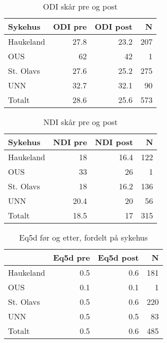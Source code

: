 \documentclass[norsk,a4paper]{article}\usepackage[]{graphicx}\usepackage[]{color}
\begin{document}
\begin{table}[ht]
\centering
\begin{tabular}{lrrr}
  \hline
Sykehus & ODI pre & ODI post & N \\ 
  \hline
Haukeland & 27.8 & 23.2 & 207 \\ 
  OUS & 62 & 42 & 1 \\ 
  St. Olavs & 27.6 & 25.2 & 275 \\ 
  UNN & 32.7 & 32.1 & 90 \\ 
  Totalt & 28.6 & 25.6 & 573 \\ 
   \hline
\end{tabular}
\caption{ODI skår pre og post} 
\end{table}
\begin{table}[ht]
\centering
\begin{tabular}{lrrr}
  \hline
Sykehus & NDI pre & NDI post & N \\ 
  \hline
Haukeland & 18 & 16.4 & 122 \\ 
  OUS & 33 & 26 & 1 \\ 
  St. Olavs & 18 & 16.2 & 136 \\ 
  UNN & 20.4 & 20 & 56 \\ 
  Totalt & 18.5 & 17 & 315 \\ 
   \hline
\end{tabular}
\caption{NDI skår pre og post} 
\end{table}


\begin{table}[ht]
\centering
\begin{tabular}{lrrr}
  \hline
 & Eq5d pre & Eq5d post & N \\ 
  \hline
Haukeland & 0.5 & 0.6 & 181 \\ 
  OUS & 0.1 & 0.1 & 1 \\ 
  St. Olavs & 0.5 & 0.6 & 220 \\ 
  UNN & 0.5 & 0.5 & 83 \\ 
  Totalt & 0.5 & 0.6 & 485 \\ 
   \hline
\end{tabular}
\caption{Eq5d før og etter, fordelt på sykehus} 
\end{table}
\end{document}
